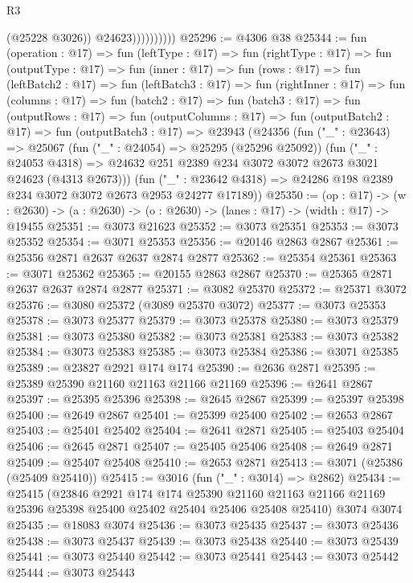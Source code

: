 \begin{lexlean}{R3}
\begin{coremodule}
                          (@25228 @3026))
                        @24623))))))))))
@25296 := @4306 @38
@25344 := fun (operation : @17) =>
  fun (leftType : @17) =>
  fun (rightType : @17) =>
  fun (outputType : @17) =>
  fun (inner : @17) =>
  fun (rows : @17) =>
  fun (leftBatch2 : @17) =>
  fun (leftBatch3 : @17) =>
  fun (rightInner : @17) =>
  fun (columns : @17) =>
  fun (batch2 : @17) =>
  fun (batch3 : @17) =>
  fun (outputRows : @17) =>
  fun (outputColumns : @17) =>
  fun (outputBatch2 : @17) =>
  fun (outputBatch3 : @17) =>
  @23943
    (@24356
      (fun ("_" : @23643) =>
      @25067
        (fun ("_" : @24054) => @25295 (@25296 @25092))
        (fun ("_" : @24053 @4318) =>
        @24632 @251 @2389 @234 @3072 @3072 @2673 @3021 @24623 (@4313 @2673)))
      (fun ("_" : @23642 @4318) => @24286 @198 @2389 @234 @3072 @3072 @2673 @2953 @24277 @17189))
@25350 := (op : @17) ->
  (w : @2630) -> (a : @2630) -> (o : @2630) -> (lanes : @17) -> (width : @17) -> @19455
@25351 := @3073 @21623
@25352 := @3073 @25351
@25353 := @3073 @25352
@25354 := @3071 @25353
@25356 := @20146 @2863 @2867
@25361 := @25356 @2871 @2637 @2637 @2874 @2877
@25362 := @25354 @25361
@25363 := @3071 @25362
@25365 := @20155 @2863 @2867
@25370 := @25365 @2871 @2637 @2637 @2874 @2877
@25371 := @3082 @25370
@25372 := @25371 @3072
@25376 := @3080 @25372 (@3089 @25370 @3072)
@25377 := @3073 @25353
@25378 := @3073 @25377
@25379 := @3073 @25378
@25380 := @3073 @25379
@25381 := @3073 @25380
@25382 := @3073 @25381
@25383 := @3073 @25382
@25384 := @3073 @25383
@25385 := @3073 @25384
@25386 := @3071 @25385
@25389 := @23827 @2921 @174 @174
@25390 := @2636 @2871
@25395 := @25389 @25390 @21160 @21163 @21166 @21169
@25396 := @2641 @2867
@25397 := @25395 @25396
@25398 := @2645 @2867
@25399 := @25397 @25398
@25400 := @2649 @2867
@25401 := @25399 @25400
@25402 := @2653 @2867
@25403 := @25401 @25402
@25404 := @2641 @2871
@25405 := @25403 @25404
@25406 := @2645 @2871
@25407 := @25405 @25406
@25408 := @2649 @2871
@25409 := @25407 @25408
@25410 := @2653 @2871
@25413 := @3071 (@25386 (@25409 @25410))
@25415 := @3016 (fun ("_" : @3014) => @2862)
@25434 := @25415
    (@23846
      @2921
      @174
      @174
      @25390
      @21160
      @21163
      @21166
      @21169
      @25396
      @25398
      @25400
      @25402
      @25404
      @25406
      @25408
      @25410)
    @3074
    @3074
@25435 := @18083 @3074
@25436 := @3073 @25435
@25437 := @3073 @25436
@25438 := @3073 @25437
@25439 := @3073 @25438
@25440 := @3073 @25439
@25441 := @3073 @25440
@25442 := @3073 @25441
@25443 := @3073 @25442
@25444 := @3073 @25443

\end{coremodule}
\end{lexlean}
